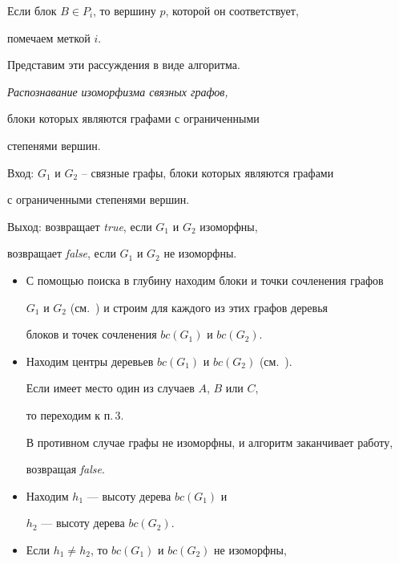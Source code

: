 Если блок $B\in P_i$, то вершину $p$, которой он соответствует,


помечаем меткой $i$.





Представим эти рассуждения в виде алгоритма.





\begin{algs}


{\it Распознавание изоморфизма связных графов,


блоки которых являются графами с ограниченными


степенями вершин.}\label{BoundBlocks}





Вход: $G_1$ и $G_2$ -- связные графы, блоки которых являются графами


с ограниченными степенями вершин.





Выход: возвращает {\it true}, если $G_1$ и $G_2$ изоморфны,


возвращает {\it false}, если $G_1$ и $G_2$ не изоморфны.


\begin{itemize}


\item[1.] С помощью поиска в глубину находим блоки и точки сочленения графов


$G_1$ и $G_2$ (см.~\cite{Minsk}) и строим для каждого из этих графов деревья


блоков и точек сочленения $bc(G_1)$ и $bc(G_2)$.


\item[2.] Находим центры деревьев $bc(G_1)$ и $bc(G_2)$ (см.~\cite{tree}).


Если имеет место один из случаев $A$, $B$ или $C$,


то переходим к п.\,3.


В противном случае графы не изоморфны, и алгоритм заканчивает работу,


возвращая {\it false}.


\item[3.] Находим $h_1$ --- высоту дерева $bc(G_1)$ и


$h_2$ --- высоту дерева $bc(G_2)$.


\item[4.] Если $h_1\ne h_2$, то $bc(G_1)$ и $bc(G_2)$ не изоморфны,



\end{itemize}
\end{algs}
